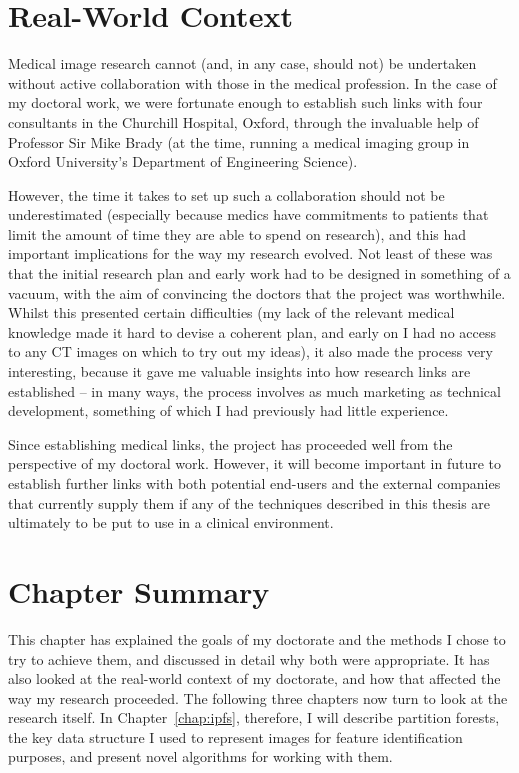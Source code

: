 
\section{Real-World Context}


Medical image research cannot (and, in any case, should not) be undertaken without active collaboration with those in the medical profession. In the case of my doctoral work, we were fortunate enough to establish such links with four consultants in the Churchill Hospital, Oxford, through the invaluable help of Professor Sir Mike Brady (at the time, running a medical imaging group in Oxford University's Department of Engineering Science).

However, the time it takes to set up such a collaboration should not be underestimated (especially because medics have commitments to patients that limit the amount of time they are able to spend on research), and this had important implications for the way my research evolved. Not least of these was that the initial research plan and early work had to be designed in something of a vacuum, with the aim of convincing the doctors that the project was worthwhile. Whilst this presented certain difficulties (my lack of the relevant medical knowledge made it hard to devise a coherent plan, and early on I had no access to any CT images on which to try out my ideas), it also made the process very interesting, because it gave me valuable insights into how research links are established -- in many ways, the process involves as much marketing as technical development, something of which I had previously had little experience.

Since establishing medical links, the project has proceeded well from the perspective of my doctoral work. However, it will become important in future to establish further links with both potential end-users and the external companies that currently supply them if any of the techniques described in this thesis are ultimately to be put to use in a clinical environment.


\section{Chapter Summary}

This chapter has explained the goals of my doctorate and the methods I chose to try to achieve them, and discussed in detail why both were appropriate. It has also looked at the real-world context of my doctorate, and how that affected the way my research proceeded. The following three chapters now turn to look at the research itself. In Chapter~\ref{chap:ipfs}, therefore, I will describe partition forests, the key data structure I used to represent images for feature identification purposes, and present novel algorithms for working with them.
